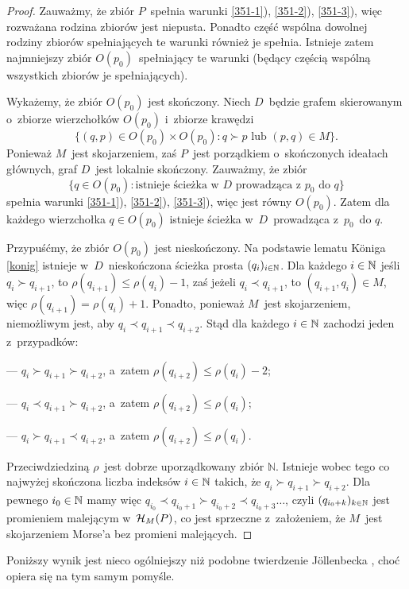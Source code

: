 \begin{proof}
Zauważmy, że zbiór $P$~spełnia warunki \ref{351-1}), \ref{351-2}), \ref{351-3}), więc rozważana rodzina zbiorów jest niepusta. Ponadto część wspólna dowolnej rodziny zbiorów spełniających te warunki również je spełnia. Istnieje zatem najmniejszy zbiór $O(p_0)$~spełniający te warunki (będący częścią wspólną wszystkich zbiorów je spełniających).

Wykażemy, że zbiór $O(p_0)$ jest skończony. Niech $D$~będzie grafem skierowanym o~zbiorze wierzchołków $O(p_0)$ i~zbiorze krawędzi \[\{(q,p)\in O(p_0)\times O(p_0):q\succ p \text{ lub } (p,q)\in M\}.\] Ponieważ $M$~jest skojarzeniem, zaś $P$~jest porządkiem o~skończonych ideałach głównych, graf $D$~jest lokalnie skończony. Zauważmy, że zbiór \[\{q\in O(p_0):\text{istnieje ścieżka w } D \text{ prowadząca z } p_0 \text{ do } q\}\] spełnia warunki \ref{351-1}), \ref{351-2}), \ref{351-3}), więc jest równy $O(p_0)$. Zatem dla każdego wierzchołka $q\in O(p_0)$ istnieje ścieżka w~$D$~prowadząca z~$p_0$~do $q$.

Przypuśćmy, że zbiór $O(p_0)$ jest nieskończony. Na podstawie lematu K\"oniga \ref{konig} istnieje w~$D$~nieskończona ścieżka prosta $(q_i)_{i\in\mathbb{N}}$. Dla każdego $i\in\mathbb{N}$ jeśli $q_i\succ q_{i+1}$, to $\rho(q_{i+1})\leq \rho(q_i)-1$, zaś jeżeli $q_{i}\prec q_{i+1}$, to $(q_{i+1},q_i)\in M$, więc $\rho(q_{i+1})=\rho(q_i)+1$. Ponadto, ponieważ $M$~jest skojarzeniem, niemożliwym jest, aby $q_i\prec q_{i+1}\prec q_{i+2}$. Stąd dla każdego $i\in \mathbb{N}$ zachodzi jeden z~przypadków:
\begin{compactitem}
\item[---] $q_i\succ q_{i+1}\succ q_{i+2}$, a~zatem $\rho(q_{i+2})\leq \rho(q_{i})-2$;
\item[---] $q_i\prec q_{i+1}\succ q_{i+2}$, a~zatem $\rho(q_{i+2})\leq \rho(q_i)$;
\item[---] $q_i\succ q_{i+1}\prec q_{i+2}$, a~zatem $\rho(q_{i+2})\leq \rho(q_i)$.
\end{compactitem}
Przeciwdziedziną $\rho$~jest dobrze uporządkowany zbiór $\mathbb{N}$. Istnieje wobec tego co najwyżej skończona liczba indeksów $i\in\mathbb{N}$ takich, że $q_i\succ q_{i+1}\succ q_{i+2}$. Dla pewnego $i_0\in \mathbb{N}$ mamy więc $q_{i_0}\prec q_{i_0+1}\succ q_{i_0+2}\prec q_{i_0+3} \dots$, czyli $(q_{i_0+k})_{k\in\mathbb{N}}$ jest promieniem malejącym w~$\mathcal{H}_M(P)$, co jest sprzeczne z~założeniem, że $M$~jest skojarzeniem Morse'a bez promieni malejących.
\end{proof}

Poniższy wynik jest nieco ogólniejszy niż podobne twierdzenie J{\"o}llenbecka \cite[Theorem 1.4]{Jollenbeck05}, choć opiera się na tym samym pomyśle.

